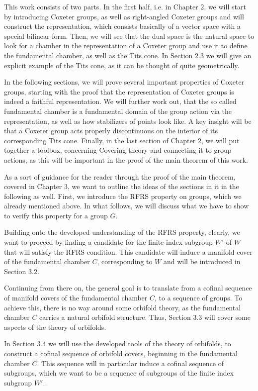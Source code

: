 This work consists of two parts.
In the first half, i.e. in Chapter \(2\), we will start by introducing Coxeter groups, as well as right-angled Coxeter groups and will construct the representation, which consists basically of a vector space with a special bilinear form.
Then, we will see that the dual space is the natural space to look for a chamber in the representation of a Coxeter group and use it to define the fundamental chamber, as well as the Tits cone.
In Section \(2.3\) we will give an explicit example of the Tits cone, as it can be thought of quite geometrically.

\noindent
In the following sections, we will prove several important properties of Coxeter groups, starting with the proof that the representation of Coxeter groups is indeed a faithful representation.
We will further work out, that the so called fundamental chamber is a fundamental domain of the group action via the representation, as well as how stabilizers of points look like.
A key insight will be that a Coxeter group acts properly discontinuous on the interior of its corresponding Tits cone.
Finally, in the last section of Chapter \(2\), we will put together a toolbox, concerning Covering theory and connecting it to group actions, as this will be important in the proof of the main theorem of this work.

As a sort of guidance for the reader through the proof of the main theorem, covered in Chapter \(3\), we want to outline the ideas of the sections in it in the following as well.
First, we introduce the RFRS property on groups, which we already mentioned above.
In what follows, we will discuss what we have to show to verify this property for a group \(G\).

\noindent
Building onto the developed understanding of the RFRS property, clearly, we want to proceed by finding a candidate for the finite index subgroup \(W'\) of \(W\) that will satisfy the RFRS condition.
This candidate will induce a manifold cover of the fundamental chamber \(C\), corresponding to \(W\) and will be introduced in Section \(3.2\).

\noindent
Continuing from there on, the general goal is to translate from a cofinal sequence of manifold covers of the fundamental chamber \(C\), to a sequence of groups.
To achieve this, there is no way around some orbifold theory, as the fundamental chamber \(C\) carries a natural orbifold structure.
Thus, Section \(3.3\) will cover some aspects of the theory of orbifolds.

\noindent
In Section \(3.4\) we will use the developed tools of the theory of orbifolds, to construct a cofinal sequence of orbifold covers, beginning in the fundamental chamber \(C\).
This sequence will in particular induce a cofinal sequence of subgroups, which we want to be a sequence of subgroups of the finite index subgroup \(W'\).

